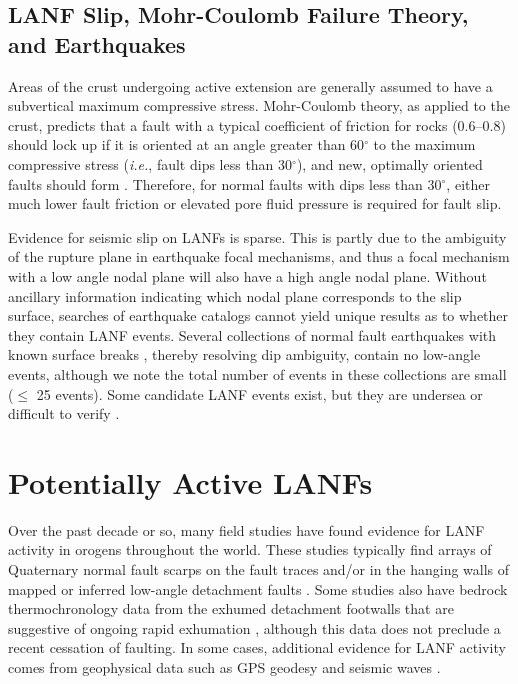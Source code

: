 \documentclass[twocolumn,grl]{AGUTeX}
\begin{document}
\begin{article}
\subsection{LANF Slip, Mohr-Coulomb Failure Theory, and Earthquakes}

Areas of the crust undergoing active extension are generally assumed to have
a subvertical maximum compressive stress.  Mohr-Coulomb theory, as applied to
the crust, predicts that a fault with a typical coefficient of friction for
rocks (0.6--0.8) should lock up if it is oriented at an angle greater than
60$^\circ$ to the maximum compressive stress  ({\it i.e.}, fault dips less than
30$^\circ$), and new, optimally oriented faults should form \citep{sibson1985}.
Therefore, for normal faults with dips less than 30$^\circ$, either much lower
fault friction or elevated pore fluid pressure is required for fault slip.

Evidence for seismic slip on LANFs is sparse.  This is partly due to the
ambiguity of the rupture plane in earthquake focal mechanisms, and thus a focal
mechanism with a low angle nodal plane will also have a high angle nodal plane.
Without ancillary information indicating which nodal plane corresponds to the
slip surface, searches of earthquake catalogs cannot yield unique results as to
whether they contain LANF events. Several collections of normal fault
earthquakes with known surface breaks \citep{jackson1987,
collettinisibson2001}, thereby resolving dip ambiguity, contain no low-angle
events, although we note the total number of events in these collections are
small ($\le$ 25 events).  Some candidate LANF events exist, but they are
undersea \citep[e.g.,][]{abers2001} or difficult to verify \citep[e.g.,]
[]{doser1987ancash}.


\section{Potentially Active LANFs}

Over the past decade or so, many field studies have found evidence for LANF
activity in orogens throughout the world. These studies typically find arrays
of Quaternary normal fault scarps on the fault traces and/or in the hanging
walls of mapped or inferred low-angle detachment faults \citep [e.g.,]
[]{axen1999baja}. Some studies also have bedrock thermochronology data from the
exhumed detachment footwalls that are suggestive of ongoing rapid exhumation
\citep [e.g.,][]{sundell2013lunggar}, although this data does not preclude
a recent cessation of faulting. In some cases, additional evidence for LANF
activity comes from geophysical data such as GPS geodesy \citep [e.g.,]
[]{hreinsdottir2009altotib} and seismic waves \citep
[e.g.,][]{doser1987ancash}.


\end{article}
\end{document}
